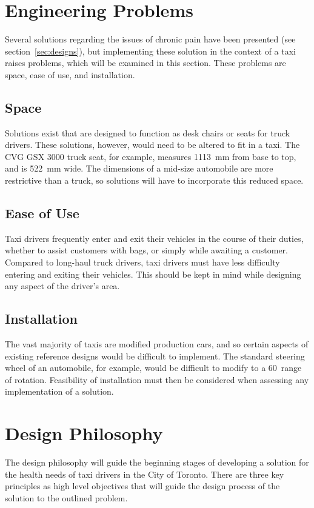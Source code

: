 \documentclass[11pt]{article}
\begin{document}
\section{Engineering Problems}
\label{sec:engprob}
Several solutions regarding the issues of chronic pain have been presented
(see section~\ref{sec:designs}), but implementing these solution in the context
of a taxi raises problems, which will be examined in this section. These 
problems are space, ease of use, and installation.

\subsection{Space}
\label{sec:space}

Solutions exist that are designed to function as desk chairs or seats for truck
drivers. These solutions, however, would need to be altered to fit in
a taxi. The CVG GSX 3000 truck seat, for example, measures 1113~mm from base
to top, and is 522~mm wide. The dimensions of a mid-size automobile
are more restrictive than a truck, so solutions will have to incorporate
this reduced space.

\subsection{Ease of Use}
\label{sec:ease}
Taxi drivers frequently enter and exit their vehicles in the course of
their duties, whether to assist customers with bags, or simply while awaiting
a customer. Compared to long-haul truck drivers, taxi drivers must have less
difficulty entering and exiting their vehicles. This should be kept in mind
while designing any aspect of the driver's area.
\subsection{Installation}
\label{sec:installation}

The vast majority of taxis are modified production cars, %
and so certain aspects of existing reference designs would be difficult to
implement. The standard steering wheel of an automobile, for example,
would be difficult to modify to a 60\textdegree~range of
rotation\cite{Ismail2003}. Feasibility of installation must then
be considered when assessing any implementation of a solution.

\section{Design Philosophy}
\label{sec:philo}
The design philosophy will guide the beginning stages of developing a
solution for the health needs of taxi drivers in the City of
Toronto. There are three key principles as high level objectives that
will guide the design process of the solution to the outlined problem.
 
\end{document}
